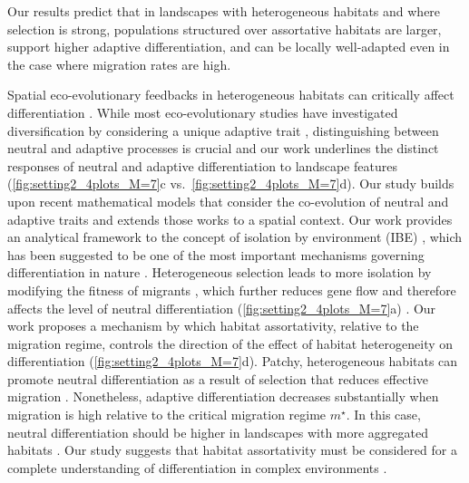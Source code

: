   Our results predict that in landscapes with heterogeneous habitats and where selection is strong, populations structured over assortative habitats are larger, support higher adaptive differentiation, and can be locally well-adapted even in the case where migration rates are high.
  
  Spatial eco-evolutionary feedbacks in heterogeneous habitats can critically affect differentiation \cite{Richardson2014}.
  While most eco-evolutionary studies have investigated diversification by considering a unique adaptive trait \cite{Doebeli2003,Kirkpatrick1997,Polechova2015,Polechova2018}, distinguishing between neutral and adaptive processes is crucial \cite{Holderegger2006} and our work underlines the distinct responses of neutral and adaptive differentiation to landscape features (\cref{fig:setting2_4plots_M=7}c vs.\ \cref{fig:setting2_4plots_M=7}d).
  Our study builds upon recent mathematical models that consider the co-evolution of neutral and adaptive traits \cite{Billiard2015,Anceschi2019} and extends those works to a spatial context. Our work provides an analytical framework to the concept of isolation by environment (IBE) \cite{Orsini2013}, which has been suggested to be one of the most important mechanisms governing differentiation in nature \cite{Wang2014}.
  Heterogeneous selection leads to more isolation by modifying the fitness of migrants \cite{Polechova2018}, which further reduces gene flow \cite{Richardson2014} and therefore affects the level of neutral differentiation (\cref{fig:setting2_4plots_M=7}a) \cite{GARANT2007}.
  Our work proposes a mechanism by which habitat assortativity, relative to the migration regime, controls the direction of the effect of habitat heterogeneity on differentiation (\cref{fig:setting2_4plots_M=7}d).
  Patchy, heterogeneous habitats can promote neutral differentiation as a result of selection that reduces effective migration \cite{Stein2014}. Nonetheless, adaptive differentiation decreases substantially when migration is high relative to the critical migration regime $m^\star$. In this case, neutral differentiation should be higher in landscapes with more aggregated habitats \cite{Richardson2014}.
  Our study suggests that habitat assortativity must be considered for a complete understanding of differentiation in complex environments \cite{Stein2014}. 
  
